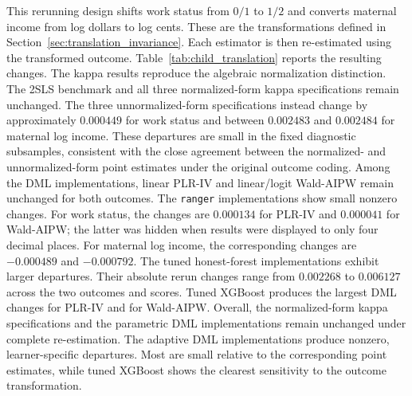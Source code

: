 \documentclass[12pt, a4paper, oneside]{article}
\theoremstyle{plain}
\theoremstyle{definition}
\begin{document}
This rerunning design shifts work status from \(0/1\) to \(1/2\) and converts maternal income from log dollars to log cents. These are the transformations defined in Section~\ref{sec:translation_invariance}. Each estimator is then re-estimated using the transformed outcome. Table~\ref{tab:child_translation} reports the resulting changes.
The kappa results reproduce the algebraic normalization distinction. The
2SLS benchmark and all three normalized-form kappa specifications remain
unchanged. The three unnormalized-form specifications instead change by
approximately \(0.000449\) for work status and between \(0.002483\) and
\(0.002484\) for maternal log income. These departures are small in the
fixed diagnostic subsamples, consistent with the close agreement between
the normalized- and unnormalized-form point estimates under the original
outcome coding.
Among the DML implementations, linear PLR-IV and linear/logit Wald-AIPW
remain unchanged for both outcomes. 
The \texttt{ranger} implementations show small nonzero changes.
For work status, the changes are \(0.000134\) for PLR-IV and \(0.000041\)
for Wald-AIPW; the latter was hidden when results were displayed to only four
decimal places. For maternal log income, the corresponding changes are
\(-0.000489\) and \(-0.000792\).
The tuned honest-forest implementations exhibit larger departures. Their
absolute rerun changes range from \(0.002268\) to \(0.006127\) across the two
outcomes and scores. Tuned XGBoost produces the largest DML changes for PLR-IV and for Wald-AIPW.
Overall, the normalized-form kappa specifications and the parametric DML
implementations remain unchanged under complete re-estimation. The adaptive
DML implementations produce nonzero, learner-specific departures. Most are
small relative to the corresponding point estimates, while tuned XGBoost
shows the clearest sensitivity to the outcome transformation.
\end{document}
